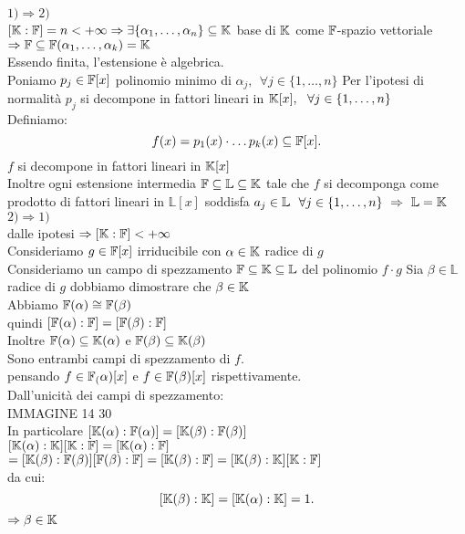 \documentclass[12px]{article}
\begin{document}
\begin{dimo}
	$1) \Rightarrow  2)$ \\
	$[\mathbb{K}:\mathbb{F}] = n < +\infty \Rightarrow  \exists \{\alpha_1,\ldots,\alpha_n\}\subseteq\mathbb{K}$ base di $\mathbb{K}$ come $\mathbb{F}$-spazio vettoriale\\
	$ \Rightarrow \mathbb{F}\subseteq\mathbb{F}(\alpha_1,\ldots,\alpha_k) = \mathbb{K}$\\
	Essendo finita, l'estensione è algebrica.\\
	Poniamo $p_j\in\mathbb{F}[x]$ polinomio minimo di  $\alpha_j, \ \ \forall j\in\{1,\ldots,n\}$ Per l'ipotesi di normalità  $p_j$ si decompone in fattori lineari in $\K[x], \ \ \forall j\in\{1,\ldots,n\}$\\
	Definiamo:
	 \[
		 f(x) = p_1(x) \cdot\ldots p_k(x)\subseteq\mathbb{F}[x]
	.\] 
	$f$ si decompone in fattori lineari in $\mathbb{K}[x]$\\
	Inoltre ogni estensione intermedia  $\mathbb{F}\subseteq\mathbb L\subseteq\mathbb{K}$ tale che  $f$ si decomponga come prodotto di fattori lineari in $\mathbb L[x]$ soddisfa  $a_j\in\mathbb L \ \ \forall j\in\{1,\ldots,n\}\ \Rightarrow  \ \mathbb L = \mathbb{K}$  \\
	 $2) \Rightarrow  1)$ \\
	 dalle ipotesi  $ \Rightarrow  [\mathbb{K}:\mathbb{F}]<+\infty$ \\
	 Consideriamo $g\in \mathbb{F}[x]$ irriducibile con $\alpha\in\mathbb{K}$ radice di  $g$ \\
	 Consideriamo un campo di spezzamento $\mathbb{F}\subseteq \mathbb{K} \subseteq \mathbb L$ del polinomio  $f\cdot g$ Sia  $\beta\in\mathbb L$ radice di  $g$ dobbiamo dimostrare  che $\beta\in\mathbb{K}$\\
	 Abbiamo  $\mathbb{F}(\alpha)\cong \mathbb{F}(\beta)$ \\
	 quindi $[\mathbb{F}(\alpha):\mathbb{F}] = [\mathbb{F}(\beta):\mathbb{F}]$\\
	 Inoltre $\mathbb{F}(\alpha)\subseteq \mathbb{K}(\alpha)$ e  $\mathbb{F}(\beta)\subseteq\mathbb{K}(\beta)$\\
	 Sono entrambi campi di spezzamento di $f$.\\
	 pensando  $f\in\mathbb{F}_(\alpha)[x]$ e $f\in\mathbb{F}(\beta)[x]$ rispettivamente.\\
	 Dall'unicità dei campi di spezzamento:\\
	 IMMAGINE 14 30\\
	 In particolare  $[\mathbb{K}(\alpha): \mathbb{F}(\alpha)] = [\mathbb{K}(\beta):\mathbb{F}(\beta)]$\\
	 $[\mathbb{K}(\alpha):\mathbb{K}][\mathbb{K}:\mathbb{F}] = [\mathbb{K}(\alpha):\mathbb{F}]$\\
	 $=[\mathbb{K}(\beta): \mathbb{F}(\beta)][\mathbb{F}(\beta):\mathbb{F}] = [\mathbb{K}(\beta):\mathbb{F}] = [\mathbb{K}(\beta):\mathbb{K}][\mathbb{K}:\mathbb{F}]$\\
	 da cui:
	 \[
		 [\mathbb{K}(\beta):\mathbb{K}] = [\mathbb{K}(\alpha):\mathbb{K}] = 1
	 .\] 
	 $ \Rightarrow  \beta \in\mathbb{K}$
\end{dimo}
\end{document}
